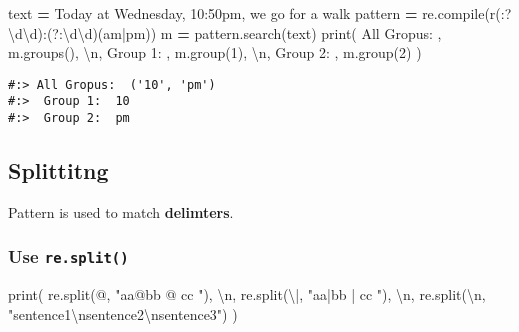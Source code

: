 \documentclass[
]{book}
\newenvironment{Shaded}{\begin{snugshade}}{\end{snugshade}}
\newcommand{\BuiltInTok}[1]{#1}
\newcommand{\CharTok}[1]{\textcolor[rgb]{0.5,0.5,0.5}{#1}}
\newcommand{\DecValTok}[1]{\textcolor[rgb]{0.06,0.06,0.06}{#1}}
\newcommand{\NormalTok}[1]{#1}
\newcommand{\OperatorTok}[1]{\textcolor[rgb]{0.43,0.43,0.43}{\textbf{#1}}}
\newcommand{\StringTok}[1]{\textcolor[rgb]{0.5,0.5,0.5}{#1}}
\newcommand{\VerbatimStringTok}[1]{\textcolor[rgb]{0.5,0.5,0.5}{#1}}
\begin{document}
\begin{Shaded}
\begin{Highlighting}[]
\NormalTok{text }\OperatorTok{=} \StringTok{\textquotesingle{}Today at Wednesday, 10:50pm, we go for a walk\textquotesingle{}}
\NormalTok{pattern }\OperatorTok{=}\NormalTok{ re.}\BuiltInTok{compile}\NormalTok{(}\VerbatimStringTok{r\textquotesingle{}(:?\textbackslash{}d\textbackslash{}d):(?:\textbackslash{}d\textbackslash{}d)(am|pm)\textquotesingle{}}\NormalTok{)}
\NormalTok{m }\OperatorTok{=}\NormalTok{ pattern.search(text)}
\BuiltInTok{print}\NormalTok{(}
  \StringTok{\textquotesingle{}All Gropus: \textquotesingle{}}\NormalTok{, m.groups(), }\StringTok{\textquotesingle{}}\CharTok{\textbackslash{}n}\StringTok{\textquotesingle{}}\NormalTok{,}
  \StringTok{\textquotesingle{}Group 1: \textquotesingle{}}\NormalTok{, m.group(}\DecValTok{1}\NormalTok{), }\StringTok{\textquotesingle{}}\CharTok{\textbackslash{}n}\StringTok{\textquotesingle{}}\NormalTok{,}
  \StringTok{\textquotesingle{}Group 2: \textquotesingle{}}\NormalTok{, m.group(}\DecValTok{2}\NormalTok{) )}
\end{Highlighting}
\end{Shaded}

\begin{verbatim}
#:> All Gropus:  ('10', 'pm') 
#:>  Group 1:  10 
#:>  Group 2:  pm
\end{verbatim}

\hypertarget{splittitng}{%
\subsection{Splittitng}\label{splittitng}}

Pattern is used to match \textbf{delimters}.

\hypertarget{use-re.split}{%
\subsubsection{\texorpdfstring{Use \texttt{re.split()}}{Use re.split()}}\label{use-re.split}}

\begin{Shaded}
\begin{Highlighting}[]
\BuiltInTok{print}\NormalTok{( re.split(}\StringTok{\textquotesingle{}@\textquotesingle{}}\NormalTok{,  }\StringTok{"aa@bb @ cc "}\NormalTok{), }\StringTok{\textquotesingle{}}\CharTok{\textbackslash{}n}\StringTok{\textquotesingle{}}\NormalTok{,}
\NormalTok{       re.split(}\StringTok{\textquotesingle{}\textbackslash{}|\textquotesingle{}}\NormalTok{, }\StringTok{"aa|bb | cc "}\NormalTok{), }\StringTok{\textquotesingle{}}\CharTok{\textbackslash{}n}\StringTok{\textquotesingle{}}\NormalTok{,}
\NormalTok{       re.split(}\StringTok{\textquotesingle{}}\CharTok{\textbackslash{}n}\StringTok{\textquotesingle{}}\NormalTok{, }\StringTok{"sentence1}\CharTok{\textbackslash{}n}\StringTok{sentence2}\CharTok{\textbackslash{}n}\StringTok{sentence3"}\NormalTok{) )}
\end{Highlighting}
\end{Shaded}
\end{document}
